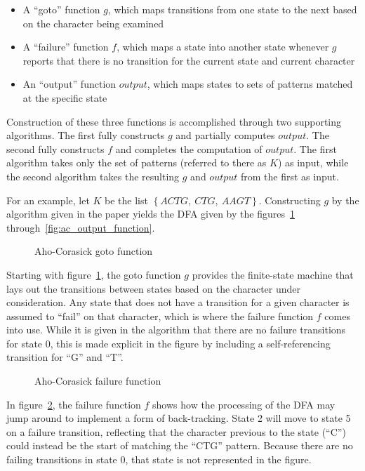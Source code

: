 \begin{itemize}
\item A ``goto'' function $g$, which maps transitions from one state to the next based on the character being examined
\item A ``failure'' function $f$, which maps a state into another state whenever $g$ reports that there is no transition for the current state and current character
\item An ``output'' function $output$, which maps states to sets of patterns matched at the specific state
\end{itemize}

Construction of these three functions is accomplished through two supporting algorithms. The first fully constructs $g$ and partially computes $output$. The second fully constructs $f$ and completes the computation of $output$. The first algorithm takes only the set of patterns (referred to there as $K$) as input, while the second algorithm takes the resulting $g$ and $output$ from the first as input.

For an example, let $K$ be the list $\left\lbrace ACTG,~CTG,~AAGT \right\rbrace$. Constructing $g$ by the algorithm given in the paper yields the DFA given by the figures~\ref{fig:ac_goto_function} through~\ref{fig:ac_output_function}.

\begin{figure}[ht]
\centering

\caption{Aho-Corasick goto function}
\label{fig:ac_goto_function}
\end{figure}

Starting with figure~\ref{fig:ac_goto_function}, the goto function $g$ provides the finite-state machine that lays out the transitions between states based on the character under consideration. Any state that does not have a transition for a given character is assumed to ``fail'' on that character, which is where the failure function $f$ comes into use. While it is given in the algorithm that there are no failure transitions for state 0, this is made explicit in the figure by including a self-referencing transition for ``G'' and ``T''.

\begin{figure}[ht]
\centering

\caption{Aho-Corasick failure function}
\label{fig:ac_failure_function}
\end{figure}

In figure~\ref{fig:ac_failure_function}, the failure function $f$ shows how the processing of the DFA may jump around to implement a form of back-tracking. State 2 will move to state 5 on a failure transition, reflecting that the character previous to the state (``C'') could instead be the start of matching the ``CTG'' pattern. Because there are no failing transitions in state 0, that state is not represented in the figure.

